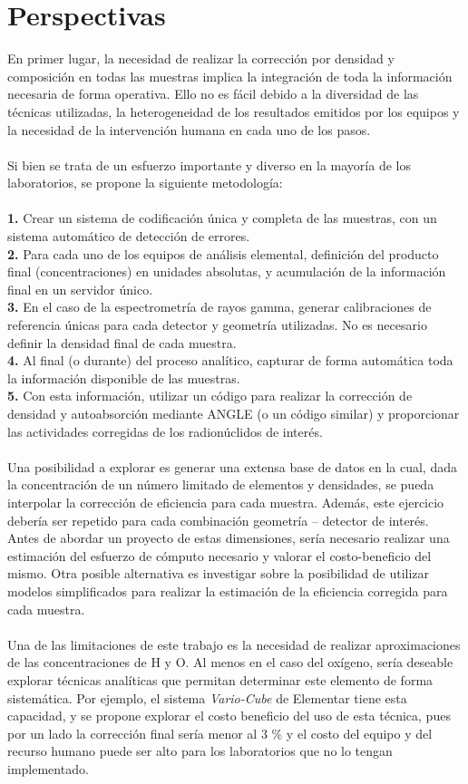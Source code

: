 \chapter{Perspectivas}
\lettrine{E}{}n primer lugar, la necesidad de realizar la corrección por densidad y composición en todas las muestras implica la integración de toda la información necesaria de forma operativa. Ello no es fácil debido a la diversidad de las técnicas utilizadas, la heterogeneidad de los resultados emitidos por los equipos y la necesidad de la intervención humana en cada uno de los pasos. 
\\
\\
Si bien se trata de un esfuerzo importante y diverso en la mayoría de los laboratorios, se propone la siguiente metodología:
\\ \\
\textbf{1.}  Crear un sistema de codificación única y completa de las muestras, con un sistema automático de detección de errores.
\\ 
\textbf{2.} Para cada uno de los equipos de análisis elemental, definición del producto final (concentraciones) en unidades absolutas, y acumulación de la información final en un servidor único. 
\\ 
\textbf{3.} En el caso de la espectrometría de rayos gamma, generar calibraciones de referencia únicas para cada detector y geometría utilizadas. No es necesario definir la densidad final de cada muestra.
\\ 
\textbf{4.} Al final (o durante) del proceso analítico, capturar de forma automática toda la información disponible de las muestras.
\\ 
\textbf{5.} Con esta información, utilizar un código para realizar la corrección de densidad y autoabsorción mediante ANGLE (o un código similar) y proporcionar las actividades corregidas de los radionúclidos de interés.
\\ \\
Una posibilidad a explorar es generar una extensa base de datos en la cual, dada la concentración de un número limitado de elementos y densidades, se pueda interpolar la corrección de eficiencia para cada muestra. Además, este ejercicio debería ser repetido para cada combinación geometría – detector de interés. Antes de abordar un proyecto de estas dimensiones, sería necesario realizar una estimación del esfuerzo de cómputo necesario y valorar el costo-beneficio del mismo. Otra posible alternativa es investigar sobre la posibilidad de utilizar modelos simplificados para realizar la estimación de la eficiencia corregida para cada muestra.
\\
\\
Una de las limitaciones de este trabajo es la necesidad de realizar aproximaciones de las concentraciones de H y O. Al menos en el caso del oxígeno, sería deseable explorar técnicas analíticas que permitan determinar este elemento de forma sistemática. Por ejemplo, el sistema \textit{Vario-Cube} de Elementar tiene esta capacidad, y se propone explorar el costo beneficio del uso de esta técnica, pues por un lado la corrección final sería menor al 3 \% y el costo del equipo y del recurso humano puede ser alto para los laboratorios que no lo tengan implementado. 